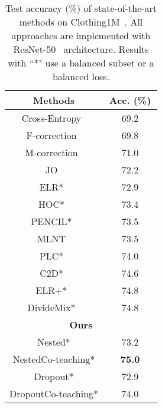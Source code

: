 \documentclass[journal]{IEEEtran}
\begin{document}
\begin{table}[t]
    \caption{Test accuracy (\%) of state-of-the-art methods on Clothing1M~\cite{xiao2015learning}. 
    All approaches are implemented with ResNet-50~\cite{he2016deep} architecture.
    Results with ``*" use a balanced subset or a balanced loss.}
    \vspace{-2mm}
    \label{tab::clothing1m}
    \begin{center}
    \begin{tabular}{c|c}
        \hline \hline
        Methods  & {\,Acc. (\%)\,}   
        \\ \hline
        Cross-Entropy~\cite{li2020dividemix} & 69.2 
        \\ 
        F-correction~\cite{patrini2017making} & 69.8 
        \\
        M-correction~\cite{arazo2019unsupervised} & 71.0 
        \\
        JO~\cite{tanaka2018joint} & 72.2 
        \\
        ELR*~\cite{liu2020early} & 72.9 
        \\
        HOC*~\cite{zhu2021clusterability} & 73.4
        \\
        PENCIL*~\cite{yi2019probabilistic} & 73.5
        \\
        MLNT~\cite{li2019learning} & 73.5 
        \\ 
        PLC*~\cite{zhang2021learning} & 74.0
        \\
        C2D*~\cite{zheltonozhskii2022contrast} & 74.6
        \\
        ELR+*~\cite{liu2020early} & 74.8 
        \\
        DivideMix*~\cite{li2020dividemix} & 74.8 
        \\ \hline
        \multicolumn{2}{c}{\bf Ours} 
        \\
        Nested* & 73.2 
        \\
        NestedCo-teaching* & \bf 75.0 
        \\
        Dropout* & 72.9
        \\
        DropoutCo-teaching* & 74.0
        \\ \hline\hline
    \end{tabular}
    \end{center}
    \vspace{-5mm}
\end{table}
\end{document}
